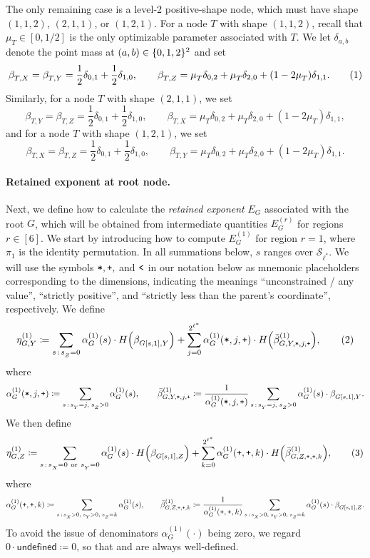 \documentclass[11pt, a4paper, copyright, gdm]{google}
\theoremstyle{definition}
\theoremstyle{remark}
\theoremstyle{plain}
\newcommand{\defn}[1]{{\emph{{#1}}}}
\newcommand{\Shapes}{\mathcal{S}}
\newcommand{\defeq}{\coloneqq}
\DeclarePairedDelimiter{\bk}{(}{)}
\DeclarePairedDelimiter{\BK}{\{}{\}}
\newcommand{\numberthis}{\addtocounter{equation}{1}\tag{\theequation}}
\renewcommand{\ip}{\text{\ttfamily +}}  %
\newcommand{\is}{\text{\ttfamily *}}  %
\newcommand{\il}{\text{\ttfamily <}}  %
\begin{document}
The only remaining case is a level-2 positive-shape node, which must have shape $(1,1,2)$, $(2,1,1)$, or $(1,2,1)$. For a node $T$ with shape $(1,1,2)$, recall that $\mu_T^{} \in [0, 1/2]$ is the only optimizable parameter associated with $T$. We let $\delta_{a,b}$ denote the point mass at $(a, b) \in \BK{0,1,2}^2$ and set
\[
  \beta_{T,X}^{} = \beta_{T,Y}^{} = \frac{1}{2}\delta_{0,1}+\frac{1}{2}\delta_{1,0},
  \qquad
  \beta_{T,Z}^{}=\mu_T^{}\delta_{0,2}+\mu_T^{}\delta_{2,0}+(1-2\mu_T^{})\delta_{1,1}. \numberthis \label{eq:def-csd-112}
\]
% 
Similarly, for a node $T$ with shape $(2,1,1)$, we set
\[
  \beta_{T,Y}^{} = \beta_{T,Z}^{} = \frac{1}{2}\delta_{0,1}+\frac{1}{2}\delta_{1,0},
  \qquad
  \beta_{T,X}^{}=\mu_T^{}\delta_{0,2}+\mu_T^{}\delta_{2,0}+(1-2\mu_T^{})\delta_{1,1}, 
\]
and for a node $T$ with shape $(1,2,1)$, we set
\[
  \beta_{T,X}^{} = \beta_{T,Z}^{} = \frac{1}{2}\delta_{0,1}+\frac{1}{2}\delta_{1,0},
  \qquad
  \beta_{T,Y}^{}=\mu_T^{}\delta_{0,2}+\mu_T^{}\delta_{2,0}+(1-2\mu_T^{})\delta_{1,1}.
\]

\paragraph{Retained exponent at root node.}
Next, we define how to calculate the \defn{retained exponent} $E_G^{}$ associated with the root $G$, which will be obtained from intermediate quantities $E_G^{(r)}$ for regions $r \in [6]$.
We start by introducing how to compute $E^{(1)}_G$ for region $r = 1$, where $\pi_1$ is the identity permutation.
In all summations below, $s$ ranges over $\Shapes_{\ell^*}^{}$.
We will use the symbols $\is,\ip,$ and $\il$ in our notation below as mnemonic placeholders corresponding to the dimensions, indicating the meanings ``unconstrained / any value'', ``strictly positive'', and ``strictly less than the parent's coordinate'', respectively. 
We define
\[
  \eta_{G,Y}^{(1)}
  \defeq
  \sum_{s \,:\, s_Z^{}=0} \alpha_G^{(1)}(s) \cdot H\bk*{\beta_{G[s,1],Y}^{}}
  +\sum_{j=0}^{2^{\ell^*}}\alpha_G^{(1)}(\is,j,\ip) \cdot H\bk*{\bar\beta_{G,Y,\is,j,\ip}^{(1)}},
  \numberthis \label{eq:global-eta-Y}
\]
where
\[
  \alpha_G^{(1)}(\is,j,\ip)
  \defeq
  \sum_{s \,:\, s_Y^{}=j,\; s_Z^{}>0}\alpha_G^{(1)}(s),
  \qquad
  \bar\beta_{G,Y,\is,j,\ip}^{(1)}
  \defeq
  \frac{1}{\alpha_G^{(1)}(\is,j,\ip)}
  \sum_{s \,:\, s_Y^{}=j,\; s_Z^{} > 0} \alpha_G^{(1)}(s) \cdot \beta_{G[s,1],Y}^{}.
\]
We then define
\[
  \eta_{G,Z}^{(1)}
  \defeq
  \sum_{s \,:\, s_X^{}=0\ \mathrm{or}\ s_Y^{}=0} \alpha_G^{(1)}(s) \cdot H\bk*{\beta_{G[s,1],Z}^{}}
  +\sum_{k=0}^{2^{\ell^*}}\alpha_G^{(1)}(\ip,\ip,k) \cdot H\bk*{\bar\beta_{G,Z,\ip,\ip,k}^{(1)}},
  \numberthis \label{eq:global-eta-Z}
\]
where
\[
  \alpha_G^{(1)}(\ip,\ip,k)
  \defeq
  \sum_{s \,:\, s_X^{}>0,\; s_Y^{}>0,\; s_Z^{}=k}\alpha_G^{(1)}(s),
  \qquad
  \bar\beta_{G,Z,\ip,\ip,k}^{(1)}
  \defeq
  \frac{1}{\alpha_G^{(1)}(\ip,\ip,k)}
  \sum_{s \,:\, s_X^{}>0,\; s_Y^{}>0,\; s_Z^{}=k} \alpha_G^{(1)}(s) \cdot \beta_{G[s,1],Z}^{}.
\]
To avoid the issue of denominators $\alpha_G^{(1)}(\cdot)$ being zero, we regard $0 \cdot \textsf{undefined} \defeq 0$, so that  and  are always well-defined.
\end{document}
